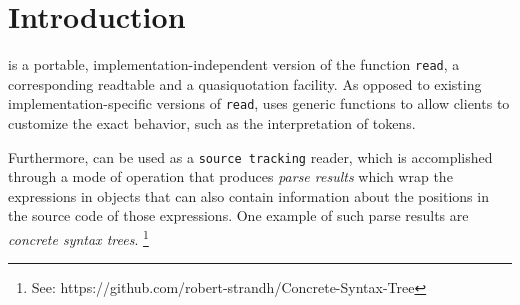 \chapter{Introduction}

\sysname{} is a portable, implementation-independent version of the
\commonlisp{} function \texttt{read}, a corresponding readtable and a
quasiquotation facility.  As opposed to existing
implementation-specific versions of \texttt{read}, \sysname{} uses
generic functions to allow clients to customize the exact behavior,
such as the interpretation of tokens.

Furthermore, \sysname{} can be used as a \texttt{source tracking}
reader, which is accomplished through a mode of operation that
produces \emph{parse results} which wrap the \commonlisp{} expressions
in objects that can also contain information about the positions in
the source code of those expressions.  One example of such parse
results are \emph{concrete syntax trees}.%
\footnote{See: https://github.com/robert-strandh/Concrete-Syntax-Tree}
